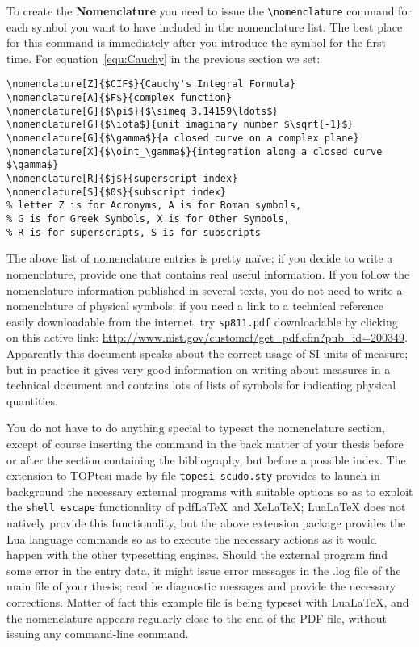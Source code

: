 To create the \textbf{Nomenclature} you need to issue the 
\verb|\nomenclature| command for each symbol you want to have included in the nomenclature list. The best place for this command is immediately after you introduce the symbol for the first time. For  equation~\eqref{equ:Cauchy} in the previous section we set:
\bgroup\small
\begin{verbatim}
\nomenclature[Z]{$CIF$}{Cauchy's Integral Formula}
\nomenclature[A]{$F$}{complex function}
\nomenclature[G]{$\pi$}{$\simeq 3.14159\ldots$}
\nomenclature[G]{$\iota$}{unit imaginary number $\sqrt{-1}$}
\nomenclature[G]{$\gamma$}{a closed curve on a complex plane}
\nomenclature[X]{$\oint_\gamma$}{integration along a closed curve $\gamma$} 
\nomenclature[R]{$j$}{superscript index}
\nomenclature[S]{$0$}{subscript index}
% letter Z is for Acronyms, A is for Roman symbols,
% G is for Greek Symbols, X is for Other Symbols, 
% R is for superscripts, S is for subscripts
\end{verbatim}
\egroup
The above list of nomenclature entries is pretty naïve; if you decide to write a nomenclature, provide one that contains real useful information. If you follow the nomenclature information published in several texts, you do not need to write a nomenclature of physical symbols; if you need a link to a technical reference easily downloadable from the internet, try \texttt{sp811.pdf} downloadable by clicking on this active link: \url{http://www.nist.gov/customcf/get_pdf.cfm?pub_id=200349}. Apparently this document speaks about the correct usage of SI units of measure; but in practice it gives very good information on writing about measures in a technical document and contains lots of lists of symbols for indicating physical quantities. 

You do not have to do anything special to typeset the nomenclature section, except of course inserting the \texttt{\string\printnomencl} command in the back matter of your thesis before or after the section containing the bibliography, but before a possible index. The extension to TOPtesi made by  file \texttt{topesi-scudo.sty} provides to launch in background the necessary external programs with suitable options so as to exploit the \texttt{shell escape} functionality of pdfLaTeX and XeLaTeX; LuaLaTeX does not natively provide this functionality, but the above extension package provides the Lua language commands so as to execute the necessary actions as it would happen with the other typesetting engines. Should the external program find some error in the entry data, it might issue error messages in the .log file of the main file of your thesis; read he diagnostic messages and provide the necessary corrections. Matter of fact this example file is being typeset with LuaLaTeX, and the nomenclature appears regularly close to the end of the PDF file, without issuing any command-line command.

